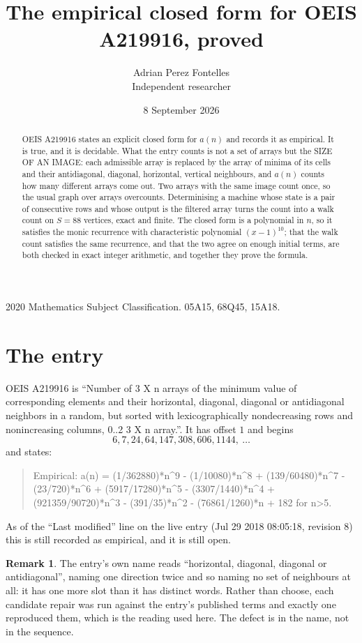 \documentclass[11pt,a4paper]{article}
\title{The empirical closed form for OEIS A219916, proved}
\author{Adrian Perez Fontelles\\ \small Independent researcher}
\date{8 September 2026}
\theoremstyle{plain}
\theoremstyle{definition}
\newtheorem{remark}[theorem]{Remark}
\begin{document}
\maketitle

\begin{abstract}
OEIS A219916 states an explicit closed form for $a(n)$ and records it as empirical. It is true, and
it is decidable. What the entry counts is not a set of arrays but the SIZE OF AN IMAGE: each
admissible array is replaced by the array of minima of its cells and their antidiagonal, diagonal, horizontal, vertical neighbours,
and $a(n)$ counts how many different arrays come out. Two arrays with the same image count
once, so the usual graph over arrays overcounts. Determinising a machine whose state is a pair
of consecutive rows and whose output is the filtered array turns the count into a walk count on
$S=88$ vertices, exact and finite. The closed form is a polynomial in $n$, so it satisfies the
monic recurrence with characteristic polynomial $(x-1)^{10}$; that the walk count
satisfies the same recurrence, and that the two agree on enough initial terms, are both checked
in exact integer arithmetic, and together they prove the formula.
\end{abstract}

\noindent\small 2020 Mathematics Subject Classification. 05A15, 68Q45, 15A18.\normalsize

\section{The entry}

OEIS A219916 is ``Number of 3 X n arrays of the minimum value of corresponding elements and their horizontal, diagonal, diagonal or antidiagonal neighbors in a random, but sorted with lexicographically nondecreasing rows and nonincreasing columns, 0..2 3 X n array.''. It has offset $1$ and begins
\[
6, 7, 24, 64, 147, 308, 606, 1144,\ \dots
\]
and states:
\begin{quote}
Empirical: a(n) = (1/362880)*n\^{}9 - (1/10080)*n\^{}8 + (139/60480)*n\^{}7 - (23/720)*n\^{}6 + (5917/17280)*n\^{}5 - (3307/1440)*n\^{}4 + (921359/90720)*n\^{}3 - (391/35)*n\^{}2 - (76861/1260)*n + 182 for n>5.
\end{quote}
As of the ``Last modified'' line on the live entry (Jul 29 2018 08:05:18, revision 8)
this is still recorded as empirical, and it is still open.

\begin{remark}
The entry's own name reads ``horizontal, diagonal, diagonal or antidiagonal'', naming one direction twice and so naming no set of
neighbours at all: it has one more slot than it has distinct words. Rather than choose, each
candidate repair was run against the entry's published terms and exactly one reproduced them,
which is the reading used here. The defect is in the name, not in the sequence.
\end{remark}
\end{document}

